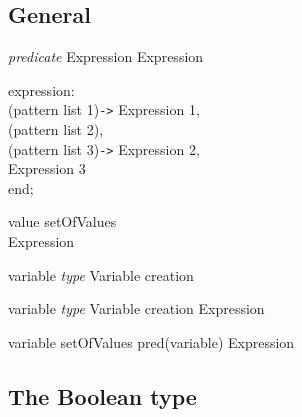 
\subsection{General}
\begin{description}
\item {} \textit{predicate}  Expression  Expression

\item {} expression:\\
      (pattern list 1){\tt ->} Expression 1,\\
      (pattern list 2),\\
      (pattern list 3){\tt ->} Expression 2,\\
        Expression 3\\
   \noindent end;

\item {} value  setOfValues\\
       Expression

\item {} variable \textit{\keyw{:} type} \keyw{:=} Variable creation \keyw{;}

\item {} variable \textit{\keyw{:} type} \keyw{=} Variable creation  Expression

\item {} variable  setOfValues  pred(variable)  Expression
\end{description}



\subsection{The Boolean type}\label{bool}


